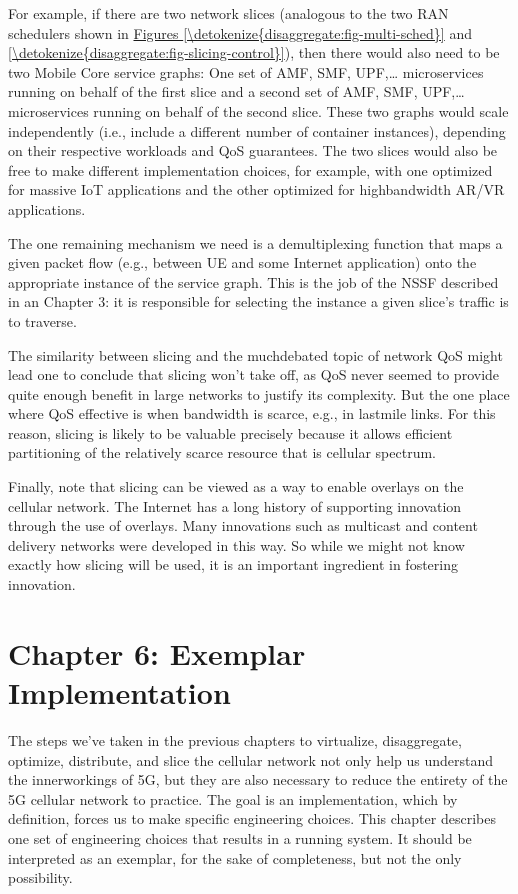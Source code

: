 \documentclass[a4paper,11pt,english]{sphinxmanual}
\begin{document}
\sphinxAtStartPar
For example, if there are two network slices (analogous to the two RAN
schedulers shown in \hyperref[\detokenize{disaggregate:fig-multi-sched}]{Figures \ref{\detokenize{disaggregate:fig-multi-sched}}} and
\hyperref[\detokenize{disaggregate:fig-slicing-control}]{\ref{\detokenize{disaggregate:fig-slicing-control}}}), then there would also need
to be two Mobile Core service graphs: One set of AMF, SMF, UPF,…
microservices running on behalf of the first slice and a second set of
AMF, SMF, UPF,… microservices running on behalf of the second
slice. These two graphs would scale independently (i.e., include a
different number of container instances), depending on their
respective workloads and QoS guarantees.  The two slices would also be
free to make different implementation choices, for example, with one
optimized for massive IoT applications and the other optimized for
high\sphinxhyphen{}bandwidth AR/VR applications.

\sphinxAtStartPar
The one remaining mechanism we need is a demultiplexing function that
maps a given packet flow (e.g., between UE and some Internet
application) onto the appropriate instance of the service graph. This is
the job of the NSSF described in an Chapter 3: it is responsible
for selecting the instance a given slice’s traffic is to traverse.

\sphinxAtStartPar
The similarity between slicing and the much\sphinxhyphen{}debated topic of network
QoS might lead one to conclude that slicing won’t take off, as QoS
never seemed to provide quite enough benefit in large networks to
justify its complexity. But the one place where QoS  effective is
when bandwidth is scarce, e.g., in last\sphinxhyphen{}mile links. For this reason,
slicing is likely to be valuable precisely because it allows efficient
partitioning of the relatively scarce resource that is cellular
spectrum.

\sphinxAtStartPar
Finally, note that slicing can be viewed as a way to enable overlays on
the cellular network. The Internet has a long history of supporting
innovation through the use of overlays. Many innovations such as
multicast and content delivery networks were developed in this way. So
while we might not know exactly how slicing will be used, it is an
important ingredient in fostering innovation.


\chapter{Chapter 6:  Exemplar Implementation}
\label{\detokenize{impl:chapter-6-exemplar-implementation}}\label{\detokenize{impl::doc}}
\sphinxAtStartPar
The steps we’ve taken in the previous chapters to virtualize,
disaggregate, optimize, distribute, and slice the cellular network not
only help us understand the inner\sphinxhyphen{}workings of 5G, but they are also
necessary to reduce the entirety of the 5G cellular network to practice.
The goal is an implementation, which by definition, forces us to make
specific engineering choices. This chapter describes one set of
engineering choices that results in a running system. It should be
interpreted as an exemplar, for the sake of completeness, but not the
only possibility.
\end{document}
